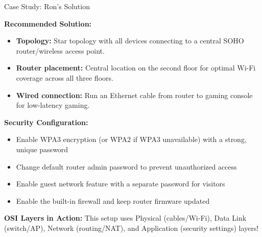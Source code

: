 \documentclass[aspectratio=169]{beamer}
\begin{document}
\begin{frame}{Case Study: Ron's Solution}

\textbf{Recommended Solution:}
\begin{itemize}
    \item \textbf{Topology:} Star topology with all devices connecting to a central SOHO router/wireless access point.
    \item \textbf{Router placement:} Central location on the second floor for optimal Wi-Fi coverage across all three floors.
    \item \textbf{Wired connection:} Run an Ethernet cable from router to gaming console for low-latency gaming.
\end{itemize}

\vspace{0.2cm}

\textbf{Security Configuration:}
\begin{itemize}
    \item Enable WPA3 encryption (or WPA2 if WPA3 unavailable) with a strong, unique password
    \item Change default router admin password to prevent unauthorized access
    \item Enable guest network feature with a separate password for visitors
    \item Enable the built-in firewall and keep router firmware updated
\end{itemize}

\vspace{0.2cm}

\textbf{OSI Layers in Action:} This setup uses Physical (cables/Wi-Fi), Data Link (switch/AP), Network (routing/NAT), and Application (security settings) layers!

\end{frame}
\end{document}
